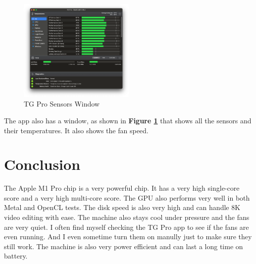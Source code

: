 \documentclass[a4paper]{article}
\begin{document}
\begin{figure}[h!]
    \centering
    \includegraphics[width=0.5\textwidth]{images/tgpro-interface.png}
    \caption{TG Pro Sensors Window}
    \label{fig:tgpro-sensors}
\end{figure}

The app also has a window, as shown in \textbf{Figure \ref{fig:tgpro-sensors}} that shows all the sensors and their temperatures. It also shows the fan speed.

\section{Conclusion}

The Apple M1 Pro chip is a very powerful chip. It has a very high single-core score and a very high multi-core score. The GPU also performs very well in both Metal and OpenCL tests. The disk speed is also very high and can handle 8K video editing with ease. The machine also stays cool under pressure and the fans are very quiet. I often find myself checking the TG Pro app to see if the fans are even running. And I even sometime turn them on manully just to make sure they still work. The machine is also very power efficient and can last a long time on battery. 
\end{document}
